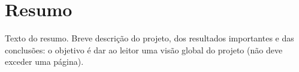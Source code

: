 \documentclass[a4paper,openright,twoside,11pt]{report}
\begin{document}
\cleardoublepage
\chapter*{Resumo}
Texto do resumo.
Breve descrição do projeto, dos resultados importantes e das conclusões: o objetivo é dar ao leitor uma visão global do projeto (não deve exceder uma página).



\cleardoublepage
\tableofcontents \cleardoublepage


\setcounter{page}{1}











\end{document}
